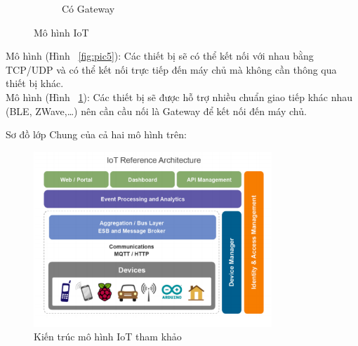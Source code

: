 \begin{figure}[H]
\begin{subfigure}[b]{0.5\textwidth}
		\caption[Có Gateway]{Có Gateway}
		\label{fig:pic6}
	\end{subfigure}
	\caption{Mô hình IoT}\label{fig:mohinhiot}
\end{figure}

Mô hình (Hình ~\ref{fig:pic5}): Các thiết bị sẽ có thể kết nối với nhau bằng TCP/UDP và có thể kết nối trực tiếp đến máy chủ mà không cần thông qua thiết bị khác.\\
Mô hình (Hình ~\ref{fig:pic6}): Các thiết bị sẽ được hỗ trợ nhiều chuẩn giao tiếp khác nhau (BLE, ZWave,…) nên cần cầu nối là Gateway để kết nối đến máy chủ. 

Sơ đồ lớp Chung của cả hai mô hình trên:
\begin{figure}[H] 
	\centering    
	\includegraphics[width=0.8\textwidth]{pic7}
	\caption[Kiến trúc mô hình IoT tham khảo]{Kiến trúc mô hình IoT tham khảo}
	\label{fig:pic7}
\end{figure}


